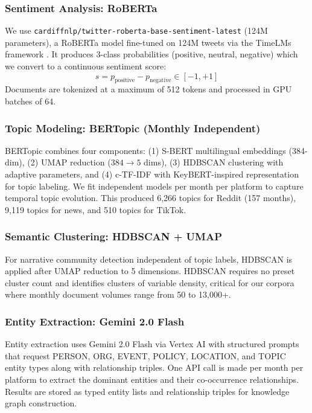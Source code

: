 \documentclass[12pt, letterpaper]{article}
\begin{document}
\subsubsection{Sentiment Analysis: RoBERTa}
We use \texttt{cardiffnlp/twitter-roberta-base-sentiment-latest} (124M parameters), a RoBERTa model fine-tuned on 124M tweets via the TimeLMs framework \cite{barbieri2020tweeteval}. It produces 3-class probabilities (positive, neutral, negative) which we convert to a continuous sentiment score:
\begin{equation}
s = p_{\text{positive}} - p_{\text{negative}} \in [-1, +1]
\end{equation}
Documents are tokenized at a maximum of 512 tokens and processed in GPU batches of 64.

\subsubsection{Topic Modeling: BERTopic (Monthly Independent)}
BERTopic \cite{grootendorst2022bertopic} combines four components: (1) S-BERT multilingual embeddings (384-dim), (2) UMAP reduction ($384 \to 5$ dims), (3) HDBSCAN clustering with adaptive parameters, and (4) c-TF-IDF with KeyBERT-inspired representation for topic labeling. We fit independent models per month per platform to capture temporal topic evolution. This produced 6,266 topics for Reddit (157 months), 9,119 topics for news, and 510 topics for TikTok.

\subsubsection{Semantic Clustering: HDBSCAN + UMAP}
For narrative community detection independent of topic labels, HDBSCAN \cite{mcinnes2017hdbscan} is applied after UMAP \cite{mcinnes2018umap} reduction to 5 dimensions. HDBSCAN requires no preset cluster count and identifies clusters of variable density, critical for our corpora where monthly document volumes range from 50 to 13,000+.

\subsubsection{Entity Extraction: Gemini 2.0 Flash}
Entity extraction uses Gemini 2.0 Flash via Vertex AI with structured prompts that request PERSON, ORG, EVENT, POLICY, LOCATION, and TOPIC entity types along with relationship triples. One API call is made per month per platform to extract the dominant entities and their co-occurrence relationships. Results are stored as typed entity lists and relationship triples for knowledge graph construction.
\end{document}
